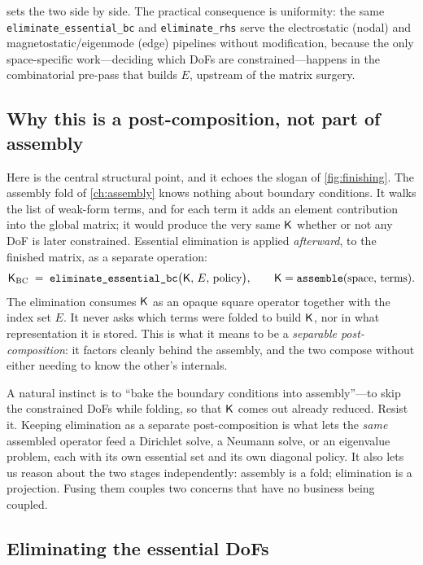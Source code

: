  sets the two side by side. The practical consequence is uniformity:
the same \texttt{eliminate\_essential\_bc} and \texttt{eliminate\_rhs} serve the
electrostatic (nodal) and magnetostatic/eigenmode (edge) pipelines without
modification, because the only space-specific work---deciding which DoFs are
constrained---happens in the combinatorial pre-pass that builds $E$, upstream of
the matrix surgery.

\subsection{Why this is a post-composition, not part of assembly}

Here is the central structural point, and it echoes the slogan of
\cref{fig:finishing}. The assembly fold of \cref{ch:assembly} knows nothing about
boundary conditions. It walks the list of weak-form terms, and for each term it
adds an element contribution into the global matrix; it would produce the very
same $\mathsf{K}$ whether or not any DoF is later constrained. Essential elimination
is applied \emph{afterward}, to the finished matrix, as a separate operation:
\[
  \mathsf{K}_{\mathrm{BC}} \;=\; \texttt{eliminate\_essential\_bc}\bigl(\mathsf{K},\,E,\,\text{policy}\bigr),
  \qquad
  \mathsf{K} = \texttt{assemble}(\text{space},\,\text{terms}).
\]
The elimination consumes $\mathsf{K}$ as an opaque square operator together with the
index set $E$. It never asks which terms were folded to build $\mathsf{K}$, nor in
what representation it is stored. This is what it means to be a \emph{separable
post-composition}: it factors cleanly behind the assembly, and the two compose
without either needing to know the other's internals.

\begin{pitfall}
A natural instinct is to ``bake the boundary conditions into assembly''---to skip
the constrained DoFs while folding, so that $\mathsf{K}$ comes out already reduced.
Resist it. Keeping elimination as a separate post-composition is what lets the
\emph{same} assembled operator feed a Dirichlet solve, a Neumann solve, or an
eigenvalue problem, each with its own essential set and its own diagonal policy.
It also lets us reason about the two stages independently: assembly is a fold;
elimination is a projection. Fusing them couples two concerns that have no
business being coupled.
\end{pitfall}

\subsection{Eliminating the essential DoFs}

